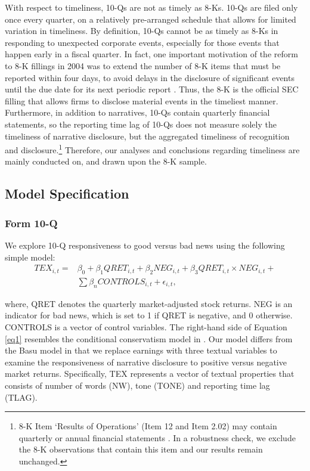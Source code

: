 \documentclass[letterpaper,12pt]{article}
\begin{document}
\begin{spacing}{1.5}
With respect to timeliness, 10-Qs are not as timely as 8-Ks. 10-Qs are filed only once every quarter, on a relatively pre-arranged schedule that allows for limited variation in timeliness. By definition, 10-Qs cannot be as timely as 8-Ks in responding to unexpected corporate events, especially for those events that happen early in a fiscal quarter. In fact, one important motivation of the reform to 8-K fillings in 2004 was to extend the number of 8-K items that must be reported within four days, to avoid delays in the disclosure of significant events until the due date for its next periodic report \cite{secFinalRuleAdditional2004}. Thus, the 8-K is the official SEC filling that allows firms to disclose material events in the timeliest manner. Furthermore, in addition to narratives, 10-Qs contain quarterly financial statements, so the reporting time lag of 10-Qs does not measure solely the timeliness of narrative disclosure, but the aggregated timeliness of recognition and disclosure.\footnote{8-K Item `Results of Operations' (Item 12 and Item 2.02) may contain quarterly or annual financial statements \cite{segalAreManagersStrategic2016}. In a robustness check, we exclude the 8-K observations that contain this item and our results remain unchanged.} Therefore, our analyses and conclusions regarding timeliness are mainly conducted on, and drawn upon the 8-K sample.

\subsection{Model Specification} \label{sec3.3}
\subsubsection{Form 10-Q} \label{sec3.3.1}
\noindent  We explore 10-Q responsiveness to good versus bad news using the following simple model: 
\begin{equation}
\begin{aligned} 
\label{eq1}
 TEX_{i,t}=
&\beta_0+\beta_1QRET_{i,t}+\beta_2NEG_{i,t}+\beta_3QRET_{i,t}\times NEG_{i,t}+\\
&\sum\beta_nCONTROLS_{i,t}+\epsilon_{i,t},
\end{aligned} 
\end{equation}

\noindent where, QRET denotes the quarterly market-adjusted stock returns. NEG is an indicator for bad news, which is set to 1 if QRET is negative, and 0 otherwise. CONTROLS is a vector of control variables. The right-hand side of Equation \eqref{eq1} resembles the conditional conservatism model in . Our model differs from the Basu model in that we replace earnings with three textual variables to examine the responsiveness of narrative disclosure to positive versus negative market returns. Specifically, TEX represents a vector of textual properties that consists of number of words (NW), tone (TONE) and reporting time lag (TLAG). 


\end{spacing}
\end{document}
